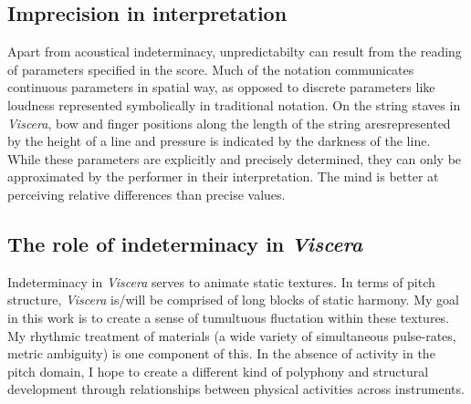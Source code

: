 \documentclass[11pt]{article}
\begin{document}
\subsection{Imprecision in interpretation}
Apart from acoustical indeterminacy, unpredictabilty can result from the reading of parameters specified in the score. Much of the notation communicates continuous parameters in spatial way, as opposed to discrete parameters like loudness represented symbolically in traditional notation. On the string staves in \textit {Viscera}, bow and finger positions along the length of the string aresrepresented by the height of a line and pressure is indicated by the darkness of the line. While these parameters are explicitly and precisely determined, they can only be approximated by the performer in their interpretation. The mind is better at perceiving relative differences than precise values.

\subsection{The role of indeterminacy in \textit {Viscera}}
Indeterminacy in \textit {Viscera} serves to animate static textures. In terms of pitch structure, \textit {Viscera} is/will be comprised of long blocks of static harmony. My goal in this work is to create a sense of tumultuous fluctation within these textures. My rhythmic treatment of materials (a wide variety of simultaneous pulse-rates, metric ambiguity) is one component of this. In the absence of activity in the pitch domain, I hope to create a different kind of polyphony and structural development through relationships between physical activities across instruments.
\end{document}
